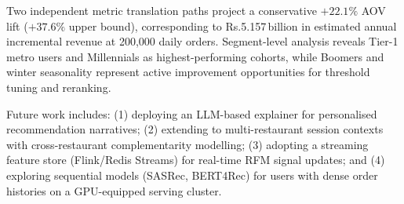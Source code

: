\documentclass[conference]{IEEEtran}
\newcommand{\rupee}{Rs.}
\begin{document}
Two independent metric translation paths project a conservative $+22.1\%$
AOV lift ($+37.6\%$ upper bound), corresponding to \rupee5.157\,billion in
estimated annual incremental revenue at 200,000 daily orders. Segment-level
analysis reveals Tier-1 metro users and Millennials as highest-performing
cohorts, while Boomers and winter seasonality represent active improvement
opportunities for threshold tuning and reranking.

Future work includes: (1) deploying an LLM-based explainer for personalised
recommendation narratives; (2) extending to multi-restaurant session contexts
with cross-restaurant complementarity modelling; (3) adopting a streaming
feature store (Flink/Redis Streams) for real-time RFM signal updates;
and (4) exploring sequential models (SASRec, BERT4Rec) for users with
dense order histories on a GPU-equipped serving cluster.
\end{document}
